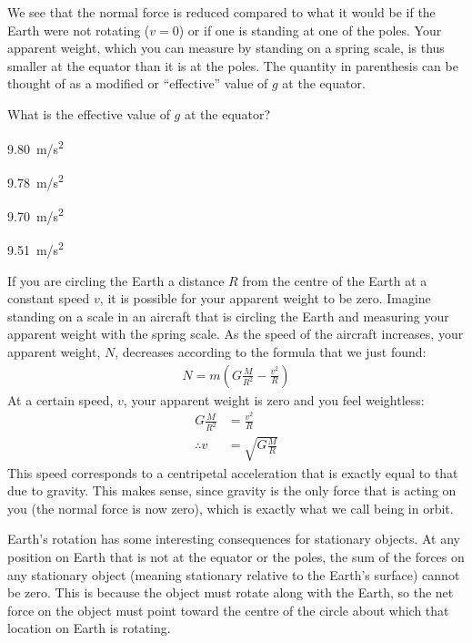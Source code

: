 We see that the normal force is reduced compared to what it would be if the Earth were not rotating ($v=0$) or if one is standing at one of the poles. Your apparent weight, which you can measure by standing on a spring scale, is thus smaller at the equator than it is at the poles. The quantity in parenthesis can be thought of as a modified or ``effective'' value of $g$ at the equator.

\begin{checkpoint}
\begin{MCquestion}{What is the effective value of $g$ at the equator?}
\item \SI{9.80}{m/s^2}
\item \SI{9.78}{m/s^2} \correct
\item \SI{9.70}{m/s^2}
\item \SI{9.51}{m/s^2}
\end{MCquestion}
\end{checkpoint}

If you are circling the Earth a distance $R$ from the centre of the Earth at a constant speed $v$, it is possible for your apparent weight to be zero. Imagine standing on a scale in an aircraft that is circling the Earth and measuring your apparent weight with the spring scale. As the speed of the aircraft increases, your apparent weight, $N$, decreases according to the formula that we just found:
\begin{align*}
N=m\left(G\frac{M}{R^2} - \frac{v^2}{R}  \right)
\end{align*}
At a certain speed, $v$, your apparent weight is zero and you feel weightless:
\begin{align*}
G\frac{M}{R^2} &= \frac{v^2}{R}\\
\therefore v&= \sqrt{G\frac{M}{R} }
\end{align*}
This speed corresponds to a centripetal acceleration that is exactly equal to that due to gravity. This makes sense, since gravity is the only force that is acting on you (the normal force is now zero), which is exactly what we call being in orbit.

Earth's rotation has some interesting consequences for stationary objects. At any position on Earth that is not at the equator or the poles, the sum of the forces on any stationary object (meaning stationary relative to the Earth's surface) cannot be zero. This is because the object must rotate along with the Earth, so the net force on the object must point toward the centre of the circle about which that location on Earth is rotating. 

